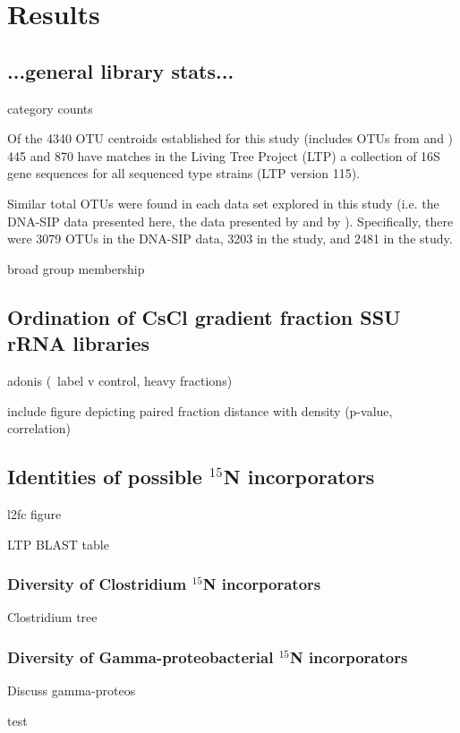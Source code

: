 \section{Results}

\subsection{...general library stats...}

category counts

Of the 4340 OTU centroids established for this study (includes OTUs from \citet{Steven_2013} and \cite{Garcia_Pichel_2013}) 445 and 870 have matches in the Living Tree Project (LTP) a collection of 16S gene sequences for all sequenced type strains \cite{Yarza_2008} (LTP version 115).

Similar total OTUs were found in each data set explored in this study (i.e. the DNA-SIP data presented here, the data presented by \citet{Steven_2013} and by \citet{Garcia_Pichel_2013}). Specifically, there were 3079 OTUs in the DNA-SIP data, 3203 in the \citet{Garcia_Pichel_2013} study, and 2481 in the \citet{Steven_2013} study.

broad group membership

\subsection{Ordination of CsCl gradient fraction SSU rRNA libraries}

adonis (~label v control, heavy fractions)

include figure depicting paired fraction distance with density (p-value, correlation)

\subsection{Identities of possible $^{15}$N incorporators}

l2fc figure

LTP BLAST table

\subsubsection{Diversity of Clostridium $^{15}$N incorporators}

Clostridium tree

\subsubsection{Diversity of Gamma-proteobacterial $^{15}$N incorporators}

Discuss gamma-proteos

test



